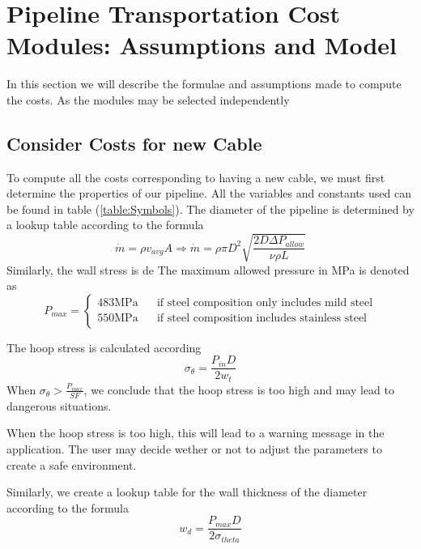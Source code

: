 \documentclass{article}
\begin{document}
\section{Pipeline Transportation Cost Modules: Assumptions and Model}
In this section we will describe the formulae and assumptions made to compute the costs. As the modules may be selected independently

\subsection{Consider Costs for new Cable}
To compute all the costs corresponding to having a new cable, we must first determine the properties of our pipeline. All the variables and constants used can be found in table (\ref{table:Symbols}). The diameter of the pipeline is determined by a lookup table according to the formula
\begin{equation}
\dot{m} = \rho v_{avg} A \Rightarrow \dot{m} = \rho\pi D^2\sqrt{\frac{2D\Delta P_{allow}}{\nu\rho L}}
\end{equation}
Similarly, the wall stress is de
The maximum allowed pressure in MPa is denoted as
\begin{equation}
P_{max} = 
\begin{cases} 
483 \text{MPa } \quad \text{ if steel composition only includes mild steel}\\
550 \text{MPa } \quad \text{ if steel composition includes stainless steel}
\end{cases}
\end{equation}

The hoop stress is calculated according
\begin{equation}
\sigma_{\theta} = \frac{P_{in}D}{2w_t}  
\end{equation}
When $\sigma_{\theta} > \frac{P_{max}}{ SF}$, we conclude that the hoop stress is too high and may lead to dangerous situations.
\begin{info}
When the hoop stress is too high, this will lead to a warning message in the application. The user may decide wether or not to adjust the parameters to create a safe environment.
\end{info}

Similarly, we create a lookup table for the wall thickness of the diameter according to the formula
\begin{equation}
w_d = \frac{P_{max}D}{2\sigma_{theta}}
\end{equation}
\end{document}

